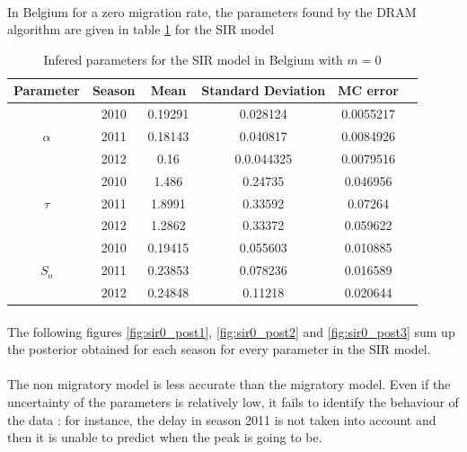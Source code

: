 \documentclass[11pt, a4paper]{article}
\begin{document}
\paragraph{}
In Belgium for a zero migration rate, the parameters found by the DRAM algorithm are given in table \ref{tab:sirm0DRAM} for the SIR model
\begin{table}[h]
\FloatBarrier
\centering
\begin{tabular}{| c | c | c | c | c | c |}
    \hline
    Parameter & Season  & Mean &  Standard Deviation & MC error\\ \hline
    \multirow{3}{*}{$\alpha$} & 2010 & 0.19291 & 0.028124 &  0.0055217 \\
    & 2011 & 0.18143 & 0.040817 & 0.0084926 \\
    & 2012 & 0.16 & 0.0.044325 & 0.0079516 \\ \hline
    \multirow{3}{*}{$\tau$} & 2010 & 1.486 & 0.24735 & 0.046956\\ 
    & 2011 & 1.8991 & 0.33592 & 0.07264 \\ 
    & 2012 & 1.2862 & 0.33372 & 0.059622 \\ \hline
    \multirow{3}{*}{$S_o$} & 2010 & 0.19415 & 0.055603 & 0.010885 \\
    & 2011 & 0.23853 & 0.078236 & 0.016589 \\ 
    & 2012 & 0.24848 & 0.11218 & 0.020644 \\ \hline
    \end{tabular}
    \caption{Infered parameters for the SIR model in Belgium with $m=0$}
    \label{tab:sirm0DRAM}
\end{table}



\paragraph{}
The following figures \ref{fig:sir0_post1}, \ref{fig:sir0_post2} and \ref{fig:sir0_post3} sum up the posterior obtained for each season for every parameter in the SIR model.

\paragraph{}
The non migratory model is less accurate than the migratory model. Even if the uncertainty of the parameters is relatively low, it fails to identify the behaviour of the data : for instance, the delay in season 2011 is not taken into account and then it is unable to predict when the peak is going to be.
\end{document}
